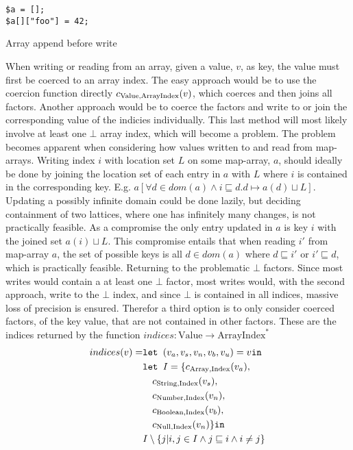 \begin{program}
\centering
\begin{lstlisting}
$a = [];
$a[]["foo"] = 42;
\end{lstlisting}
\caption{Array append before write}
\label{lst:appendbefw}
\end{program}
When writing or reading from an array, given a value, $v$, as key, the value must first be coerced to an array index. The easy approach would be to use the coercion function directly $c_{\text{Value}, \text{ArrayIndex}}(v)$, which coerces and then joins all factors. Another approach would be to coerce the factors and write to or join the corresponding value of the indicies individually. This last method will most likely involve at least one $\bot$ array index, which will become a problem. The problem becomes apparent when considering how values written to and read from map-arrays. Writing index $i$ with location set $L$ on some map-array, $a$, should ideally be done by joining the location set of each entry in $a$ with $L$ where $i$ is contained in the corresponding key. E.g. $a[\forall d \in dom(a)\wedge i \sqsubseteq d. d \mapsto a(d)\sqcup L]$. Updating a possibly infinite domain could be done lazily, but deciding containment of two lattices, where one has infinitely many changes, is not practically feasible. As a compromise the only entry updated in $a$ is key $i$ with the joined set $a(i)\sqcup L$. This compromise entails that when reading $i'$ from map-array $a$, the set of possible keys is all $d\in dom(a)$ where $d\sqsubseteq i'$ or $i'\sqsubseteq d$, which is practically feasible. Returning to the problematic $\bot$ factors. Since most writes would contain a at least one $\bot$ factor, most writes would, with the second approach, write to the $\bot$ index, and since $\bot$ is contained in all indices, massive loss of precision is ensured. Therefor a third option is to only consider coerced factors, of the key value, that are not contained in other factors. These are the indices returned by the function $indices: \text{Value} \rightarrow \text{ArrayIndex}^*$
\newcommand{\is}{\texttt{ is }}
\begin{align}
    indices(v) =    &\texttt{let } (v_a,v_s, v_n, v_b, v_u) = v \texttt{in }\notag\\
                    & \texttt{let } I = \{ c_{\text{Array}, \text{Index}}(v_a),\notag\\
                    &\quad c_{\text{String}, \text{Index}}(v_s),\notag\\
                    &\quad c_{\text{Number}, \text{Index}}(v_n),\notag\\
                    &\quad c_{\text{Boolean}, \text{Index}}(v_b),\notag\\
                    &\quad c_{\text{Null}, \text{Index}}(v_n) \} \texttt{in }\notag\\
                    &I \setminus \{j|i,j\in I \wedge j\sqsubseteq i \wedge i \neq j \}
\end{align}
